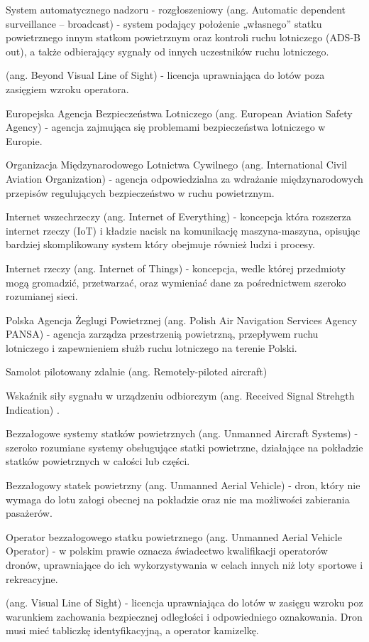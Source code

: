 \suppressfloats[t]

\begin{description}[\setleftmargin{65pt}\setlabelstyle{\bfseries}]
    \leftskip=1cm
    \item[ADS-B] System automatycznego nadzoru - rozgłoszeniowy (ang. Automatic dependent surveillance – broadcast) - system podający położenie „własnego” statku powietrznego innym statkom powietrznym oraz kontroli ruchu lotniczego (ADS-B out), a także odbierający sygnały od innych uczestników ruchu lotniczego.
    \item[BVLOS] (ang. Beyond Visual Line of Sight) - licencja uprawniająca do lotów poza zasięgiem wzroku operatora.
    \item[EASA] Europejska Agencja Bezpieczeństwa Lotniczego (ang. European Aviation Safety Agency) - agencja zajmująca się problemami bezpieczeństwa lotniczego w Europie.
    \item[ICAO] Organizacja Międzynarodowego Lotnictwa Cywilnego (ang. International Civil Aviation Organization) - agencja odpowiedzialna za wdrażanie międzynarodowych przepisów regulujących bezpieczeństwo w ruchu powietrznym.
    \item[IoE] Internet wszechrzeczy (ang. Internet of Everything) - koncepcja która rozszerza internet rzeczy (IoT) i kładzie nacisk na komunikację maszyna-maszyna, opisując bardziej skomplikowany system który obejmuje również ludzi i procesy.
    \item[IoT] Internet rzeczy (ang. Internet of Things) - koncepcja, wedle której przedmioty mogą gromadzić, przetwarzać, oraz wymieniać dane za pośrednictwem szeroko rozumianej sieci.
    \item[PAŻP] Polska Agencja Żeglugi Powietrznej (ang. Polish Air Navigation Services Agency PANSA) - agencja zarządza przestrzenią powietrzną, przepływem ruchu lotniczego i zapewnieniem służb ruchu lotniczego na terenie Polski.
    \item[RPA] Samolot pilotowany zdalnie (ang. Remotely-piloted aircraft) 
    \item[RSSI] Wskaźnik siły sygnału w urządzeniu odbiorczym (ang. Received Signal Strehgth Indication) \cite{rssi}.	    
    \item[UAS] Bezzałogowe systemy statków powietrznych (ang. Unmanned Aircraft Systems) - szeroko rozumiane systemy obsługujące statki powietrzne, działające na pokładzie statków powietrznych w całości lub części.
    \item[UAV] Bezzałogowy statek powietrzny (ang. Unmanned Aerial Vehicle) - dron, który nie wymaga do lotu załogi obecnej na pokładzie oraz nie ma możliwości zabierania pasażerów.
    \item[UAVO] Operator bezzałogowego statku powietrznego (ang. Unmanned Aerial Vehicle Operator) - 
w polskim prawie oznacza świadectwo kwalifikacji operatorów dronów, uprawniające do ich wykorzystywania w celach  innych niż loty sportowe i rekreacyjne.
    \item[VLOS] (ang. Visual Line of Sight) - licencja uprawniająca do lotów w zasięgu wzroku poz warunkiem zachowania bezpiecznej odległości i odpowiedniego oznakowania. Dron musi mieć tabliczkę identyfikacyjną, a operator kamizelkę.
\end{description}
